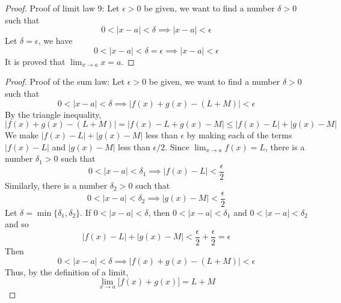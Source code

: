 \begin{proof}
    Proof of limit law 9:
    Let \(\epsilon>0\) be given,
    we want to find a number \(\delta>0\) such
    that \[0<|x-a|<\delta\implies|x-a|<\epsilon\]
    Let \(\delta=\epsilon\),
    we have
    \[0<|x-a|<\delta=\epsilon\implies|x-a|<\epsilon\]
    It is proved that \(\displaystyle{\lim_{x\to a}x=a}\).
\end{proof}
\begin{proof}
    Proof of the sum law:
    Let \(\epsilon>0\) be given,
    we want to find a number \(\delta>0\) such that
    \[0<|x-a|<\delta\implies|f(x)+g(x)-(L+M)|<\epsilon\]
    By the triangle inequality,
    \[|f(x)+g(x)-(L+M)|=|f(x)-L+g(x)-M|\leq|f(x)-L|+|g(x)-M|\]
    We make \(|f(x)-L|+|g(x)-M|\) less than \(\epsilon\) by making each of the
    terms \(|f(x)-L|\) and \(|g(x)-M|\) less than \(\epsilon/2\).
    Since \(\displaystyle{\lim_{x\to a}f(x)=L}\),
    there is a number \(\delta_1>0\) such that
    \[0<|x-a|<\delta_1\implies|f(x)-L|<\frac{\epsilon}{2}\]
    Similarly,
    there is a number \(\delta_2>0\) such that
    \[0<|x-a|<\delta_2\implies|g(x)-M|<\frac{\epsilon}{2}\]
    Let \(\delta=\min\{\delta_1,\delta_2\}\).
    If \(0<|x-a|<\delta\),
    then \(0<|x-a|<\delta_1\) and \(0<|x-a|<\delta_2\)
    and so
    \[|f(x)-L|+|g(x)-M|<\frac{\epsilon}{2}+\frac{\epsilon}{2}=\epsilon\]
    Then
    \[0<|x-a|<\delta\implies|f(x)+g(x)-(L+M)|<\epsilon\]
    Thus,
    by the definition of a limit,
    \[\lim_{x\to a}\big[f(x)+g(x)\big]=L+M\]
\end{proof}
